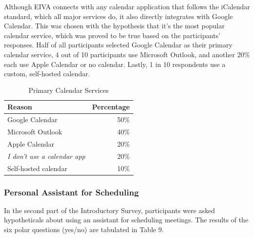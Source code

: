 \documentclass{article}
\begin{document}
Although EIVA connects with any calendar application that follows the iCalendar standard, which all major services do, it also directly integrates with Google Calendar. This was chosen with the hypothesis that it's the most popular calendar service, which was proved to be true based on the participants' responses. Half of all participants selected Google Calendar as their primary calendar service, 4 out of 10 participants use Microsoft Outlook, and another 20\% each use Apple Calendar or no calendar. Lastly, 1 in 10 respondents use a custom, self-hosted calendar.

\begin{table}[!htb]
	\begin{minipage}{1\linewidth}
		\caption{Primary Calendar Services}
		\centering
		\begin{tabular}{lr}
			\hline
			\textbf{Reason}                   & \textbf{Percentage} \\
			\hline
			Google Calendar                   & 50\%                \\
			Microsoft Outlook                 & 40\%                \\
			Apple Calendar                    & 20\%                \\
			\emph{I don't use a calendar app} & 20\%                \\
			Self-hosted calendar              & 10\%                \\
			\hline
		\end{tabular}
	\end{minipage}%
\end{table}

\subsubsection{Personal Assistant for Scheduling}

In the second part of the Introductory Survey, participants were asked hypotheticals about using an assistant for scheduling meetings. The results of the six polar questions (yes/no) are tabulated in Table 9.
\end{document}
